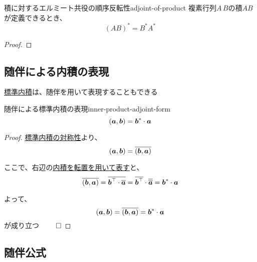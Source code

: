 \documentclass[../../../topic_linear-algebra]{subfiles}
\begin{document}
\br

\begin{theorem}{積に対するエルミート共役の順序反転性}{adjoint-of-product}
  複素行列$A\,B$の積$AB$が定義できるとき、
  \begin{equation*}
    (AB)^* = B^* A^*
  \end{equation*}
\end{theorem}

\begin{proof}
  \todo{}
\end{proof}

\subsection{随伴による内積の表現}

\hyperref[def:standard-inner-product-Cn]{標準内積}は、随伴を用いて表現することもできる

\begin{theorem}{随伴による標準内積の表現}{inner-product-adjoint-form}
  \begin{equation*}
    (\vb*{a},\vb*{b}) = \vb*{b}^* \cdot \vb*{a}
  \end{equation*}
\end{theorem}

\begin{proof}
  \hyperref[thm:standard-inner-product-symmetry]{標準内積の対称性}より、
  \begin{equation*}
    (\vb*{a},\vb*{b}) = \overline{(\vb*{b},\vb*{a})}
  \end{equation*}

  ここで、右辺の\hyperref[thm:inner-product-as-transpose-product]{内積を転置を用いて表す}と、
  \begin{equation*}
    \overline{(\vb*{b},\vb*{a})} = \overline{\vb*{b}^\top \cdot \overline{\vb*{a}}} = \overline{\vb*{b}^\top} \cdot \overline{\overline{\vb*{a}}} = \vb*{b}^* \cdot \vb*{a}
  \end{equation*}

  よって、
  \begin{equation*}
    (\vb*{a},\vb*{b}) = \overline{(\vb*{b},\vb*{a})} = \vb*{b}^* \cdot \vb*{a}
  \end{equation*}
  が成り立つ $\qed$
\end{proof}

\subsection{随伴公式}
\end{document}
